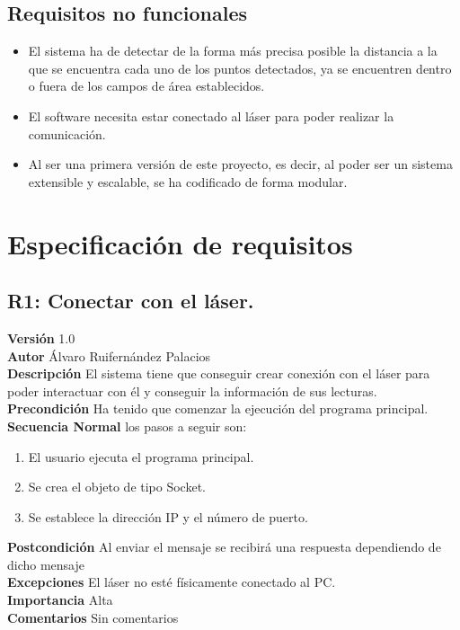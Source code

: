 \subsection{Requisitos no funcionales}
\begin{itemize}
	\item El sistema ha de detectar de la forma más precisa posible la distancia a la que se encuentra cada uno de los puntos detectados, ya se encuentren dentro o fuera de los campos de área establecidos.
	\item El software necesita estar conectado al láser para poder realizar la comunicación.
	\item Al ser una primera versión de este proyecto, es decir, al poder ser un sistema extensible y escalable, se ha codificado de forma modular.
\end{itemize}
\section{Especificación de requisitos}
\subsection{R1: Conectar con el láser.}
\textbf{Versión} 1.0\\
\textbf{Autor} Álvaro Ruifernández Palacios\\
\textbf{Descripción} El sistema tiene que conseguir crear conexión con el láser para poder interactuar con él y conseguir la información de sus lecturas.\\
\textbf{Precondición} Ha tenido que comenzar la ejecución del programa principal.\\
\textbf{Secuencia Normal} los pasos a seguir son:
\begin{enumerate}
	\item El usuario ejecuta el programa principal.
	\item Se crea el objeto de tipo Socket.
	\item Se establece la dirección IP y el número de puerto.
\end{enumerate}
\textbf{Postcondición} Al enviar el mensaje se recibirá una respuesta dependiendo de dicho mensaje\\
\textbf{Excepciones} El láser no esté físicamente conectado al PC.\\
\textbf{Importancia} Alta\\
\textbf{Comentarios} Sin comentarios\\

